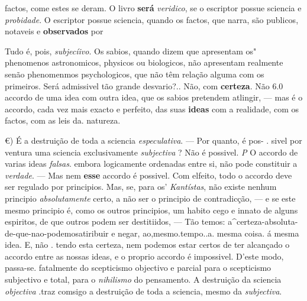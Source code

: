 factos, come estes se deram. O livro \textbf{será} \emph{veridico}, se o escriptor possue sciencia e \emph{probidade}. O escriptor possue sciencia, quando os factos, que narra, são publicos, notaveis e \textbf{observados} por

Tudo é, pois, \emph{subjecíivo}. Os sabios, quando dizem que apresentam os" phenomenos astronomicos, physicos ou biologicos, não apresentam realmente senão phenomenmos psychologicos, que não têm relação alguma com os primeiros. Será admissivel tão grande desvario?.. Não, com \textbf{certeza}. Não 6.0 accordo de uma idea com outra idea, que os sabios pretendem atlingir, --- mas é o accordo, cada vez mais exacto e perfeito, das suas \textbf{ideas} com a realidade, com os factos, com as leis da. natureza.

€) É a destruição de toda a sciencia \emph{especulativa}. --- Por quanto, é pos- . sivel por ventura uma sciencia exclusivamente \emph{subjectiva} ? Não é possivel. \emph{P} O accordo de varias ideas \emph{falsas}. embora logicamente ordenadas entre si, não pode constituir a \emph{verdade}. --- Mas nem \textbf{esse} accordo é possivel. Com elfeito, todo o accordo deve ser regulado por principios. Mas, se, para os' \emph{Kantístas}, não existe nenhum principio \emph{absolutamente} certo, a não ser o principio de contradicção, --- e se este mesmo principio é, como os outros principios, um habito cego e innato de alguns espiritos, de que outros podem ser destitiidos, --- Tão temos: a\textasciicircum{}certeza-absoluta-de-que-nao-podemosatiribuir e negar, ao,mesmo.tempo..a. mesma coisa. á mesma idea. E, não . tendo esta certeza, nem podemos estar certos de ter alcançado o accordo entre as nossas ideas, e o proprio accordo é impossivel. D'este modo, passa-se. fatalmente do scepticismo objectivo e parcial para o scepticismo subjectivo e total, para o \emph{nihilismo} do pensamento. A destruição da sciencia \emph{objectiva} .traz comsigo a destruição de toda a sciencia, mesmo da \emph{subjectiva}.

